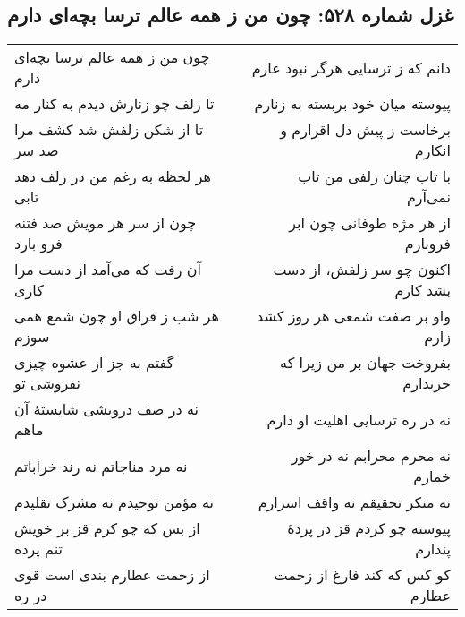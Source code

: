 \begin{center}
\section*{غزل شماره ۵۲۸: چون من ز همه عالم ترسا بچه‌ای دارم}
\label{sec:528}
\begin{longtable}{l p{0.5cm} r}
چون من ز همه عالم ترسا بچه‌ای دارم
&&
دانم که ز ترسایی هرگز نبود عارم
\\
تا زلف چو زنارش دیدم به کنار مه
&&
پیوسته میان خود بربسته به زنارم
\\
تا از شکن زلفش شد کشف مرا صد سر
&&
برخاست ز پیش دل اقرارم و انکارم
\\
هر لحظه به رغم من در زلف دهد تابی
&&
با تاب چنان زلفی من تاب نمی‌آرم
\\
چون از سر هر مویش صد فتنه فرو بارد
&&
از هر مژه طوفانی چون ابر فروبارم
\\
آن رفت که می‌آمد از دست مرا کاری
&&
اکنون چو سر زلفش، از دست بشد کارم
\\
هر شب ز فراق او چون شمع همی سوزم
&&
واو بر صفت شمعی هر روز کشد زارم
\\
گفتم به جز از عشوه چیزی نفروشی تو
&&
بفروخت جهان بر من زیرا که خریدارم
\\
نه در صف درویشی شایستهٔ آن ماهم
&&
نه در ره ترسایی اهلیت او دارم
\\
نه مرد مناجاتم نه رند خراباتم
&&
نه محرم محرابم نه در خور خمارم
\\
نه مؤمن توحیدم نه مشرک تقلیدم
&&
نه منکر تحقیقم نه واقف اسرارم
\\
از بس که چو کرم قز بر خویش تنم پرده
&&
پیوسته چو کردم قز در پردهٔ پندارم
\\
از زحمت عطارم بندی است قوی در ره
&&
کو کس که کند فارغ از زحمت عطارم
\\
\end{longtable}
\end{center}
